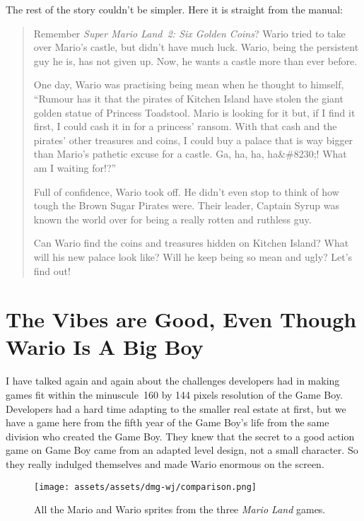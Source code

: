\documentclass{book}
\begin{document}
The rest of the story couldn’t be simpler. Here it is straight from the manual:

\begin{quote}
Remember \emph{Super Mario Land 2: Six Golden Coins}? Wario tried to take over Mario’s castle, but didn’t have much luck. Wario, being the persistent guy he is, has not given up. Now, he wants a castle more than ever before.

One day, Wario was practising being mean when he thought to himself, “Rumour has it that the pirates of Kitchen Island have stolen the giant golden statue of Princess Toadstool. Mario is looking for it but, if I find it first, I could cash it in for a princess’ ransom. With that cash and the pirates’ other treasures and coins, I could buy a palace that is way bigger than Mario’s pathetic excuse for a castle. Ga, ha, ha, ha&\#8230;! What am I waiting for!?”

Full of confidence, Wario took off. He didn’t even stop to think of how tough the Brown Sugar Pirates were. Their leader, Captain Syrup was known the world over for being a really rotten and ruthless guy.

Can Wario find the coins and treasures hidden on Kitchen Island? What will his new palace look like? Will he keep being so mean and ugly?
Let’s find out!
\end{quote} \par

\FloatBarrier\needspace{10mm}\section*{The Vibes are Good, Even Though Wario Is A Big Boy}\nopagebreak[4]

I have talked again and again about the challenges developers had in making games fit within the minuscule 160 by 144 pixels resolution of the Game Boy. Developers had a hard time adapting to the smaller real estate at first, but we have a game here from the fifth year of the Game Boy’s life from the same division who created the Game Boy. They knew that the secret to a good action game on Game Boy came from an adapted level design, not a small character. So they really indulged themselves and made Wario enormous on the screen.

\begin{figure}[hbt]
\vskip 10pt
\centering \texttt{[image: assets/assets/dmg-wj/comparison.png]}\par\pagetwodescription All the Mario and Wario sprites from the three \emph{Mario Land} games.
\vskip 6pt
\end{figure}
\end{document}
